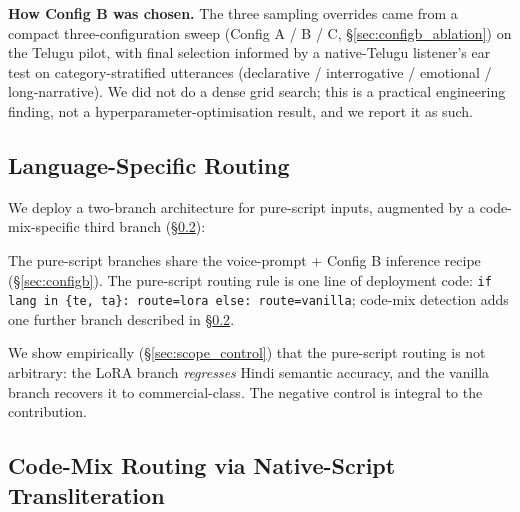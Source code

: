 \documentclass[conference,a4paper]{IEEEtran}
\newcommand{\configb}{Config B}
\begin{document}
\textbf{How \configb{} was chosen.} The three sampling overrides came from a compact three-configuration sweep (Config A / B / C, §\ref{sec:configb_ablation}) on the Telugu pilot, with final selection informed by a native-Telugu listener's ear test on category-stratified utterances (declarative / interrogative / emotional / long-narrative). We did not do a dense grid search; this is a practical engineering finding, not a hyperparameter-optimisation result, and we report it as such.

\subsection{Language-Specific Routing}
\label{sec:routing}

We deploy a two-branch architecture for pure-script inputs, augmented by a code-mix-specific third branch (§\ref{sec:codemix_routing}):

\begin{center}
\end{center}

The pure-script branches share the voice-prompt + \configb{} inference recipe (§\ref{sec:configb}). The pure-script routing rule is one line of deployment code: \texttt{if lang in \{te, ta\}: route=lora else: route=vanilla}; code-mix detection adds one further branch described in §\ref{sec:codemix_routing}.

We show empirically (§\ref{sec:scope_control}) that the pure-script routing is not arbitrary: the LoRA branch \emph{regresses} Hindi semantic accuracy, and the vanilla branch recovers it to commercial-class. The negative control is integral to the contribution.

\subsection{Code-Mix Routing via Native-Script Transliteration}
\label{sec:codemix_routing}
\end{document}

